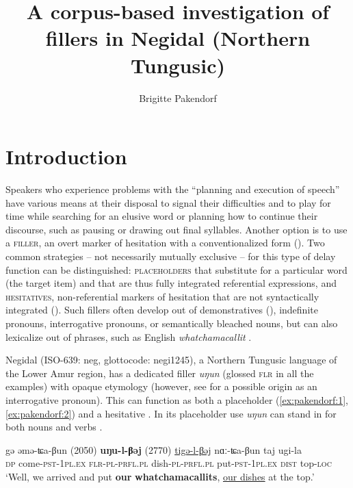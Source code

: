\documentclass[output=paper]{langscibook}
\author{Brigitte Pakendorf\orcid{}\affiliation{Laboratoire Dynamique du Langage (CNRS \& Université Lumière Lyon 2)}}
\title{A corpus-based investigation of fillers in Negidal (Northern Tungusic)}
\begin{document}
\maketitle 
{}%




\section{Introduction}
\label{sec:pakendorf:1}
Speakers who experience problems with the “planning and execution of speech” \citep[452]{Lickley2015}  have various means at their disposal to signal their difficulties and to play for time while searching for an elusive word or planning how to continue their discourse, such as pausing or drawing out final syllables. Another option is to use a \textsc{filler,} an overt marker of hesitation with a conventionalized form (\citealt{Tree2002}). Two common strategies – not necessarily mutually exclusive – for this type of delay function can be distinguished: \textsc{placeholders} that substitute for a particular word (the target item) and that are thus fully integrated referential expressions, and \textsc{hesitatives}, non-referential markers of hesitation that are not syntactically integrated (\citealt{HayashiYoon2006}). Such fillers often develop out of demonstratives (\citealt{HayashiYoon2006}), indefinite pronouns, interrogative pronouns, or semantically bleached nouns, but can also lexicalize out of phrases, such as English \textit{whatchamacallit} \citep[12--13]{Podlesskaya2010}.

Negidal (ISO-639: neg, glottocode: negi1245), a Northern Tungusic language of the Lower Amur region, has a dedicated filler \textit{uŋun} (glossed \textsc{flr} in all the examples) with opaque etymology (however, see \cite{chapters/klyachko} for a possible origin as an interrogative pronoun). This can function as both a placeholder (\ref{ex:pakendorf:1}, \ref{ex:pakendorf:2}) and a hesitative . In its placeholder use \textit{uŋun} can stand in for both nouns  and verbs . 


\ea \label{ex:pakendorf:1}
\gll gə
	əmə-ʨa-βun
	\textup{(2050)}
	\textbf{uŋu-l-βəj}
	\textup{(2770)}
	\uline{tigə-l-βəj}
	nɑː-ʨa-βun
	taj
	ugi-la\\
	\textsc{dp}
	come\textsc{{}-pst-1pl.ex}
	{}
	\textsc{flr-pl-prfl.pl}
	{}
	dish\textsc{{}-pl-prfl.pl}
	put\textsc{{}-pst-1pl.ex}
	\textsc{dist}
	top\textsc{{}-loc}\\
\glt ‘Well, we arrived and put \textbf{our} \textbf{whatchamacallits}, \uline{our dishes} at the top.’ 
\z
\end{document}
